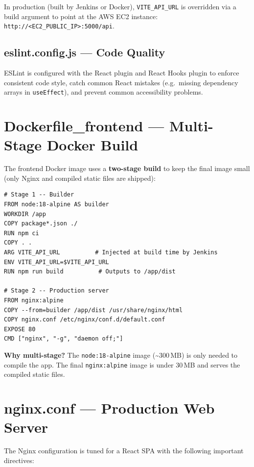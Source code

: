 \documentclass[12pt,a4paper]{report}
\begin{document}
In production (built by Jenkins or Docker), \texttt{VITE\_API\_URL} is overridden via a build argument to point at the AWS EC2 instance: \texttt{http://<EC2_PUBLIC_IP>:5000/api}.

\subsection{eslint.config.js --- Code Quality}

ESLint is configured with the React plugin and React Hooks plugin to enforce consistent code style, catch common React mistakes (e.g.\ missing dependency arrays in \texttt{useEffect}), and prevent common accessibility problems.

\section{Dockerfile\_frontend --- Multi-Stage Docker Build}

The frontend Docker image uses a \textbf{two-stage build} to keep the final image small (only Nginx and compiled static files are shipped):

\begin{lstlisting}[caption={Multi-stage Dockerfile\_frontend logic}]
# Stage 1 -- Builder
FROM node:18-alpine AS builder
WORKDIR /app
COPY package*.json ./
RUN npm ci
COPY . .
ARG VITE_API_URL          # Injected at build time by Jenkins
ENV VITE_API_URL=$VITE_API_URL
RUN npm run build          # Outputs to /app/dist

# Stage 2 -- Production server
FROM nginx:alpine
COPY --from=builder /app/dist /usr/share/nginx/html
COPY nginx.conf /etc/nginx/conf.d/default.conf
EXPOSE 80
CMD ["nginx", "-g", "daemon off;"]
\end{lstlisting}

\textbf{Why multi-stage?} The \texttt{node:18-alpine} image (\textasciitilde{}300\,MB) is only needed to compile the app. The final \texttt{nginx:alpine} image is under 30\,MB and serves the compiled static files.

\section{nginx.conf --- Production Web Server}

The Nginx configuration is tuned for a React SPA with the following important directives:
\end{document}
